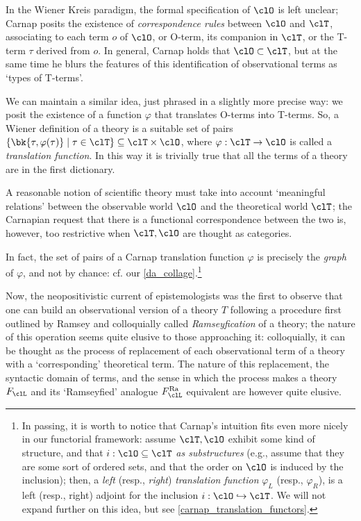 In the Wiener Kreis paradigm, the formal specification of $\clO$ is left unclear; Carnap \cite{carnapfound} posits the existence of \emph{correspondence rules} between $\clO$ and $\clT$, associating to each term $o$ of $\clO$, or O-term, its companion in $\clT$, or the T-term $\tau$ derived from $o$. In general, Carnap holds that $\clO \subset \clT$, but at the same time he blurs the features of this identification of observational terms as `types of T-terms'.

We can maintain a similar idea, just phrased in a slightly more precise way: we posit the existence of a function $\varphi$ that translates O-terms into T-terms. So, a Wiener definition of a theory is a suitable set of pairs $\{\bk{\tau,\varphi(\tau)} \mid \tau\in\clT\}\subseteq \clT\times\clO$, where $\varphi: \clT \to \clO$ is called a \emph{translation function}. In this way it is trivially true that all the terms of a theory are in the first dictionary.
\begin{remark*}
	A reasonable notion of scientific theory must take into account `meaningful relations' between the observable world $\clO$ and the theoretical world $\clT$; the Carnapian request that there is a functional correspondence between the two is, however, too restrictive when $\clT,\clO$ are thought as categories.
\end{remark*}
In fact, the set of pairs of a Carnap translation function $\varphi$ is precisely the \emph{graph} of $\varphi$, and not by chance: cf. our \autoref{da_collage}.\footnote{In passing, it is worth to notice that Carnap's intuition fits even more nicely in our functorial framework: assume $\clT, \clO$ exhibit some kind of structure, and that $i : \clO\subseteq\clT$ \emph{as substructures} (e.g., assume that they are some sort of ordered sets, and that the order on $\clO$ is induced by the inclusion); then, a \emph{left} (resp., \emph{right}) \emph{translation function} $\varphi_L$ (resp., $\varphi_R$), is a left (resp., right) adjoint for the inclusion $i : \clO\hookrightarrow \clT$. We will not expand further on this idea, but see \autoref{carnap_translation_functors}.}

Now, the neopositivistic current of epistemologists was the first to observe that one can build an observational version of a theory $T$ following a procedure first outlined by Ramsey \cite{ramsey1931foundations} and colloquially called \emph{Ramseyfication} of a theory; the nature of this operation seems quite elusive to those approaching it: colloquially, it can be thought as the process of replacement of each observational term of a theory with a `corresponding' theoretical term. The nature of this replacement, the syntactic domain of terms, and the sense in which the process makes a theory $F_\clL$ and its `Ramseyfied' analogue $F_\clL^\text{Ra}$ equivalent are however quite elusive.

